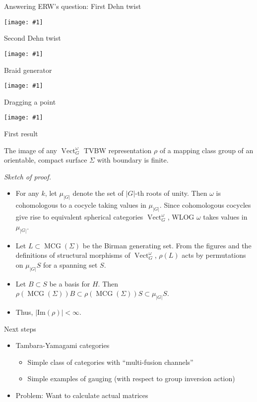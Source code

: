 \documentclass{beamer}
\renewcommand{\Im}{\mathrm{Im}}
\DeclareMathOperator{\MCG}{MCG}
\DeclareMathOperator{\Vect}{Vect}
\newcommand{\img}[1]{
\vfill
\texttt{[image: \#1]}
\vfill
}
\begin{document}
\begin{frame}{Answering ERW's question: First Dehn twist}
\img{t1}
\end{frame}

\begin{frame}{Second Dehn twist}
\img{t2}
\end{frame}

\begin{frame}{Braid generator}
\img{t3}
\end{frame}

\begin{frame}{Dragging a point}
\img{t4}
\end{frame}

\begin{frame}{First result}

\begin{theorem}
The image of any $\Vect^\omega_G$ TVBW representation $\rho$ of a mapping class group of an orientable, compact surface $\Sigma$ with boundary is finite.
\end{theorem}

\emph{Sketch of proof.}  

\begin{itemize}
\item For any $k$, let $\mu_{|G|}$ denote the set of $|G|$-th roots of unity. Then $\omega$ is cohomologous to a cocycle taking values in $\mu_{|G|}$.  Since cohomologous cocycles give rise to equivalent spherical categories $\Vect^\omega_G$, WLOG $\omega$ takes values in $\mu_{|G|}$.

\pause \item  Let $L \subset \MCG(\Sigma)$ be the Birman generating set. From the figures and the definitions of structural morphisms of $\Vect_G^\omega$,  $\rho(L)$ acts by permutations on $\mu_{|G|} S$ for a spanning set $S$.

\pause \item Let $B \subset S$ be a basis for $H$. Then $\rho(\MCG(\Sigma)) B \subset \rho(\MCG(\Sigma)) S \subset \mu_{|G|}  S$.
 
 \pause \item   Thus, $|\Im(\rho)| < \infty$.
\end{itemize}

\end{frame}

\begin{frame}{Next steps}
\begin{itemize}
\item Tambara-Yamagami categories
\begin{itemize}
\item Simple class of categories with ``multi-fusion channels''
\item Simple examples of gauging (with respect to group inversion action)
\end{itemize}
\item Problem: Want to calculate actual matrices 
\end{itemize}
\end{frame}
\end{document}
